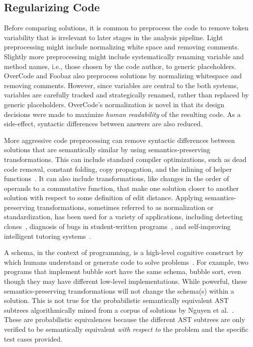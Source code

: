 \subsection{Regularizing Code}
Before comparing solutions, it is common to preprocess the code to remove token variability that is irrelevant to later stages in the analysis pipeline. Light preprocessing might include normalizing white space and removing comments. Slightly more preprocessing might include systematically renaming variable and method names, i.e., those chosen by the code author, to generic placeholders. OverCode and Foobaz also preprocess solutions by normalizing whitespace and removing comments. However, since variables are central to the both systems, variables are carefully tracked and strategically renamed, rather than replaced by generic placeholders. OverCode’s normalization is novel in that its design decisions were made to maximize {\it human readability} of the resulting code. As a side-effect, syntactic differences between answers are also reduced.


More aggressive code preprocessing can remove syntactic differences between solutions that are semantically similar by using semantics-preserving transformations. This can include standard compiler optimizations, such as dead code removal, constant folding, copy propagation, and the inlining of helper functions~\cite{rivers2015data}. It can also include transformations, like changes in the order of operands to a commutative function, that make one solution closer to another solution with respect to some definition of edit distance. Applying semantics-preserving transformations, sometimes referred to as normalization or standardization, has been used for a variety of applications, including detecting clones~\cite{baxter,CCFinder}, diagnosis of bugs in student-written programs~\cite{xutransformation}, and self-improving intelligent tutoring systems~\cite{rivers2015data}. 

A schema, in the context of programming, is a high-level cognitive construct by which humans understand or generate code to solve problems~\cite{Soloway1984}. For example, two programs that implement bubble sort have the same schema, bubble sort, even though they may have different low-level implementations. While powerful, these semantics-preserving transformations will not change the schema(s) within a solution. This is not true for the probabilistic semantically equivalent AST subtrees algorithmically mined from a corpus of solutions by Nguyen et al.~\cite{codewebs}. These are probabilistic equivalences because the different AST subtrees are only verified to be semantically equivalent {\it with respect to} the problem and the specific test cases provided. 

